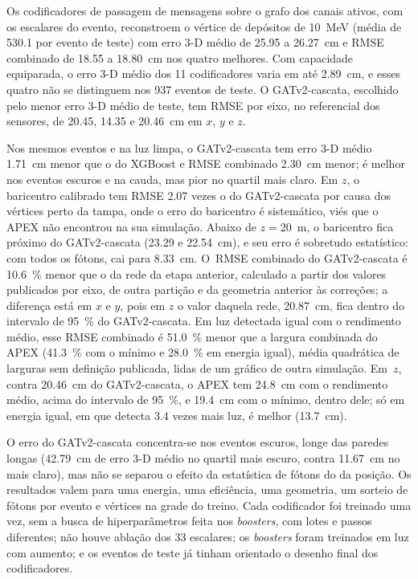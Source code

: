\label{sec:conclusoes}

Os codificadores de passagem de mensagens sobre o grafo dos canais ativos, com os escalares do evento, reconstroem o vértice de depósitos de \qty{10}{\MeV} (média de \qty{530.1}{\pe} por evento de teste) com erro 3-D médio de \num{25.95} a \qty{26.27}{\cm} e RMSE combinado de \num{18.55} a \qty{18.80}{\cm} nos quatro melhores. Com capacidade equiparada, o erro 3-D médio dos \num{11} codificadores varia em até \qty{2.89}{\cm}, e esses quatro não se distinguem nos \num{937} eventos de teste. O GATv2-cascata, escolhido pelo menor erro 3-D médio de teste, tem RMSE por eixo, no referencial dos sensores, de \num{20.45}, \num{14.35} e \qty{20.46}{\cm} em $x$, $y$ e $z$.

Nos mesmos eventos e na luz limpa, o GATv2-cascata tem erro 3-D médio \qty{1.71}{\cm} menor que o do XGBoost e RMSE combinado \qty{2.30}{\cm} menor; é melhor nos eventos escuros e na cauda, mas pior no quartil mais claro. Em $z$, o baricentro calibrado tem RMSE \num{2.07} vezes o do GATv2-cascata por causa dos vértices perto da tampa, onde o erro do baricentro é sistemático, viés que o APEX não encontrou na sua simulação. Abaixo de $z = {}$\qty{20}{\m}, o baricentro fica próximo do GATv2-cascata (\num{23.29} e \qty{22.54}{\cm}), e seu erro é sobretudo estatístico: com todos os fótons, cai para \qty{8.33}{\cm}. O~RMSE combinado do GATv2-cascata é \qty{10.6}{\percent} menor que o da rede da etapa anterior, calculado a partir dos valores publicados por eixo, de outra partição e da geometria anterior às correções; a diferença está em $x$ e $y$, pois em $z$ o valor daquela rede, \qty{20.87}{\cm}, fica dentro do intervalo de \qty{95}{\percent} do GATv2-cascata. Em luz detectada igual com o rendimento médio, esse RMSE combinado é \qty{51.0}{\percent} menor que a largura combinada do APEX (\qty{41.3}{\percent} com o mínimo e \qty{28.0}{\percent} em energia igual), média quadrática de larguras sem definição publicada, lidas de um gráfico de outra simulação. Em~$z$, contra \qty{20.46}{\cm} do GATv2-cascata, o APEX tem \qty{24.8}{\cm} com o rendimento médio, acima do intervalo de \qty{95}{\percent}, e \qty{19.4}{\cm} com o mínimo, dentro dele; só em energia igual, em que detecta \num{3.4} vezes mais luz, é melhor (\qty{13.7}{\cm}).

{ O erro do GATv2-cascata concentra-se nos eventos escuros, longe das paredes longas (\qty{42.79}{\cm} de erro 3-D médio no quartil mais escuro, contra \qty{11.67}{\cm} no mais claro), mas não se separou o efeito da estatística de fótons do da posição. Os resultados valem para uma energia, uma eficiência, uma geometria, um sorteio de fótons por evento e vértices na grade do treino. Cada codificador foi treinado uma vez, sem a busca de hiperparâmetros feita nos \textit{boosters}, com lotes e passos diferentes; não houve ablação dos \num{33} escalares; os \textit{boosters} foram treinados em luz com aumento; e os eventos de teste já tinham orientado o desenho final dos codificadores.\par}

